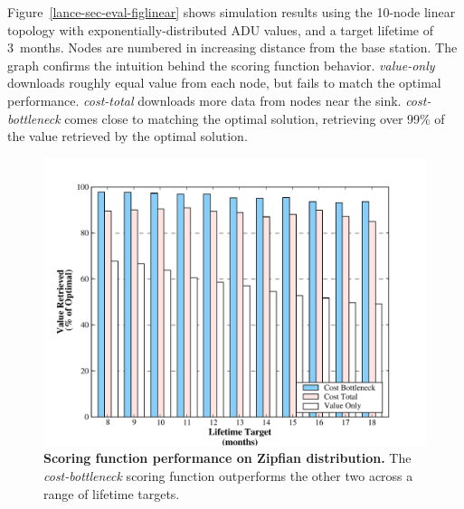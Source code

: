 Figure~\ref{lance-sec-eval-figlinear} shows simulation results using the
10-node linear topology with exponentially-distributed ADU values, and a
target lifetime of 3~months.  Nodes are numbered in increasing distance from
the base station.  The graph confirms the intuition behind the scoring
function behavior.  \emph{value-only} downloads roughly equal value from each
node, but fails to match the optimal performance. \emph{cost-total} downloads
more data from nodes near the sink.  \emph{cost-bottleneck} comes close to
matching the optimal solution, retrieving over 99\% of the value retrieved by
the optimal solution.

\begin{figure}[t]
\label{lance-sec-eval-zipfian}
\begin{center}
\includegraphics[width=1.0\hsize]{./4-lance/figs/gwa/zipfian/POLICIES.pdf}
\end{center}
\caption{\textbf{Scoring function performance on Zipfian distribution.}
The {\em cost-bottleneck} scoring function outperforms the other two across a
range of lifetime targets.}
\end{figure}

